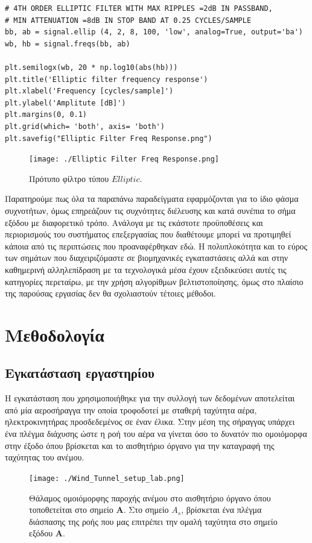 \documentclass[breaklines=true, 12pt]{article}
\begin{document}
{{{
\begin{verbatim}
# 4TH ORDER ELLIPTIC FILTER WITH MAX RIPPLES =2dB IN PASSBAND,
# MIN ATTENUATION =8dB IN STOP BAND AT 0.25 CYCLES/SAMPLE
bb, ab = signal.ellip (4, 2, 8, 100, 'low', analog=True, output='ba')
wb, hb = signal.freqs(bb, ab)

plt.semilogx(wb, 20 * np.log10(abs(hb)))
plt.title('Elliptic filter frequency response')
plt.xlabel('Frequency [cycles/sample]')
plt.ylabel('Amplitute [dB]')
plt.margins(0, 0.1)
plt.grid(which= 'both', axis= 'both')
plt.savefig("Elliptic Filter Freq Response.png")
\end{verbatim}

\begin{figure}[htbp]
\centering
\texttt{[image: ./Elliptic Filter Freq Response.png]}
\caption{Πρότυπο φίλτρο τύπου \(Elliptic\).}
\end{figure}

Παρατηρούμε πως όλα τα παραπάνω παραδείγματα εφαρμόζονται για το ίδιο φάσμα
συχνοτήτων, όμως επηρεάζουν τις συχνότητες διέλευσης και κατά συνέπια το
σήμα εξόδου με διαφορετικό τρόπο. Ανάλογα με τις εκάστοτε προϋποθέσεις και
περιορισμούς του συστήματος επεξεργασίας που διαθέτουμε μπορεί να προτιμηθεί
κάποια από τις περιπτώσεις που προαναφέρθηκαν εδώ. Η πολυπλοκότητα και το εύρος
των σημάτων που διαχειριζόμαστε σε βιομηχανικές εγκαταστάσεις αλλά και στην
καθημερινή αλληλεπίδραση με τα τεχνολογικά μέσα έχουν εξειδικεύσει αυτές τις
κατηγορίες περεταίρω, με την χρήση αλγορίθμων βελτιστοποίησης, όμως στο πλαίσιο
της παρούσας εργασίας δεν θα σχολιαστούν τέτοιες μέθοδοι.

\section{Μεθοδολογία}
\label{sec:org539519e}
\subsection{Εγκατάσταση εργαστηρίου}
\label{sec:org186130d}
    Η εγκατάσταση που χρησιμοποιήθηκε για την συλλογή των δεδομένων
αποτελείται από μία αεροσήραγγα την οποία τροφοδοτεί με σταθερή ταχύτητα
αέρα, ηλεκτροκινητήρας προσδεδεμένος σε έναν έλικα. Στην μέση της
σήραγγας υπάρχει ένα πλέγμα διάχυσης ώστε η ροή του αέρα να γίνεται όσο
το δυνατόν πιο ομοιόμορφα στην έξοδο όπου βρίσκεται και το αισθητήριο
όργανο για την καταγραφή της ταχύτητας του ανέμου.

\begin{figure}[htbp]
\centering
\texttt{[image: ./Wind\_Tunnel\_setup\_lab.png]}
\caption{Θάλαμος ομοιόμορφης παροχής ανέμου στο αισθητήριο όργανο όπου τοποθετείται στο σημείο \textbf{Α}. Στο σημείο  \textbf{\(A_{s}\)}, βρίσκεται ένα πλέγμα διάσπασης της ροής που μας επιτρέπει την ομαλή ταχύτητα στο σημείο εξόδου \textbf{A}.}
\end{figure}

}}}
\end{document}
